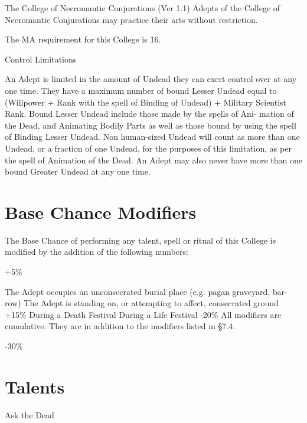 \begin{Chapter}{The College of Necromantic Conjurations (Ver 1.1)}
Adepts of the College of Necromantic Conjurations 
may practice their arts without restriction. 

The MA requirement for this College is 16. 

Control Limitations 

An Adept is limited in the amount of Undead they 
can exert control over at any one time. They have a 
maximum  number  of  bound  Lesser  Undead  equal 
to (Willpower + Rank with the spell of Binding of 
Undead)  +  Military  Scientist  Rank.  Bound  Lesser 
Undead  include  those  made  by  the  spells  of  Ani-
mation of the Dead, and Animating Bodily Parts as 
well  as  those  bound  by  using  the  spell  of  Binding 
Lesser  Undead.  Non  human-sized  Undead  will 
count  as  more  than  one  Undead,  or  a  fraction  of 
one Undead, for the purposes of this limitation, as 
per  the  spell  of  Animation  of  the  Dead.  An  Adept 
may also never have more than one bound Greater 
Undead at any one time. 

\section{Base Chance Modifiers}

The Base Chance of performing any talent, spell or 
ritual of this College is modified by the addition of 
the following numbers:  

+5\% 

The Adept occupies an unconsecrated 
burial place (e.g. pagan graveyard, bar-
row) 
The Adept is standing on, or attempting 
to affect, consecrated ground 
+15\%  
During a Death Festival 
During a Life Festival 
-20\% 
All modifiers are cumulative. They are in addition 
to the modifiers listed in §7.4. 

-30\% 

\section{Talents}

\begin{talent}[T-1]{Ask the Dead }



\end{talent}
\end{Chapter}

